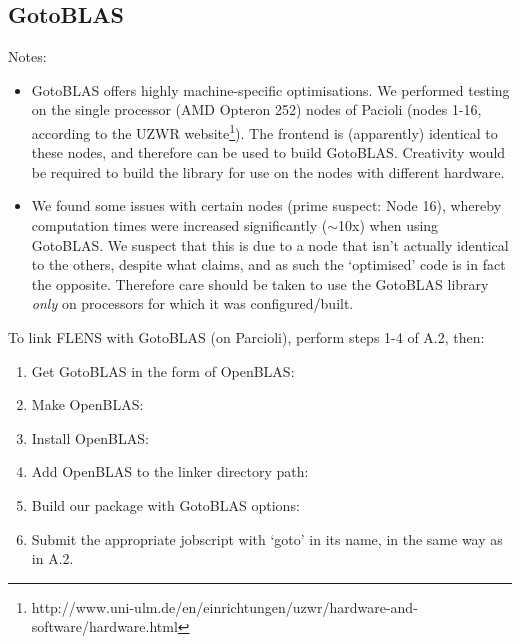  \subsection{GotoBLAS}
 
 Notes:
 \begin{itemize}
    \item GotoBLAS offers highly machine-specific optimisations. We performed testing on the single processor (AMD Opteron 252) nodes of Pacioli (nodes 1-16, according to the UZWR website\footnote{http://www.uni-ulm.de/en/einrichtungen/uzwr/hardware-and-software/hardware.html}). The frontend is (apparently\footnotemark[2]) identical to these nodes, and therefore can be used to build GotoBLAS. Creativity would be required to build the library for use on the nodes with different hardware.
    \item We found some issues with certain nodes (prime suspect: Node 16), whereby computation times were increased significantly ($\sim$10x) when using GotoBLAS. We suspect that this is due to a node that isn't actually identical to the others, despite what \footnotemark[2] claims, and as such the `optimised' code is in fact the opposite. Therefore care should be taken to use the GotoBLAS library \emph{only} on processors for which it was configured/built.
 \end{itemize}
 To link FLENS with GotoBLAS (on Parcioli), perform steps 1-4 of A.2, then:
 
 \begin{enumerate}
    \item Get GotoBLAS in the form of OpenBLAS:
    \item Make OpenBLAS:
    \item Install OpenBLAS:
    \item Add OpenBLAS to the linker directory path:
    
    \item Build our package with GotoBLAS options:
    \item Submit the appropriate jobscript with `goto' in its name, in the same way as in A.2.
\end{enumerate}
    
    
    
    
    
    
    
    
    
    
    
      
      